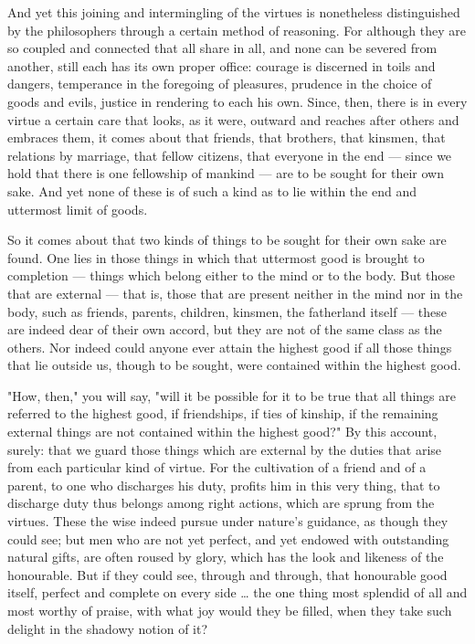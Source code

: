  And yet this joining and intermingling of the virtues is nonetheless distinguished by the philosophers through a certain method of reasoning. For although they are so coupled and connected that all share in all, and none can be severed from another, still each has its own proper office: courage is discerned in toils and dangers, temperance in the foregoing of pleasures, prudence in the choice of goods and evils, justice in rendering to each his own. Since, then, there is in every virtue a certain care that looks, as it were, outward and reaches after others and embraces them, it comes about that friends, that brothers, that kinsmen, that relations by marriage, that fellow citizens, that everyone in the end — since we hold that there is one fellowship of mankind — are to be sought for their own sake. And yet none of these is of such a kind as to lie within the end and uttermost limit of goods.

 So it comes about that two kinds of things to be sought for their own sake are found. One lies in those things in which that uttermost good is brought to completion — things which belong either to the mind or to the body. But those that are external — that is, those that are present neither in the mind nor in the body, such as friends, parents, children, kinsmen, the fatherland itself — these are indeed dear of their own accord, but they are not of the same class as the others. Nor indeed could anyone ever attain the highest good if all those things that lie outside us, though to be sought, were contained within the highest good.

 "How, then," you will say, "will it be possible for it to be true that all things are referred to the highest good, if friendships, if ties of kinship, if the remaining external things are not contained within the highest good?" By this account, surely: that we guard those things which are external by the duties that arise from each particular kind of virtue. For the cultivation of a friend and of a parent, to one who discharges his duty, profits him in this very thing, that to discharge duty thus belongs among right actions, which are sprung from the virtues. These the wise indeed pursue under nature's guidance, as though they could see; but men who are not yet perfect, and yet endowed with outstanding natural gifts, are often roused by glory, which has the look and likeness of the honourable. But if they could see, through and through, that honourable good itself, perfect and complete on every side … the one thing most splendid of all and most worthy of praise, with what joy would they be filled, when they take such delight in the shadowy notion of it?

